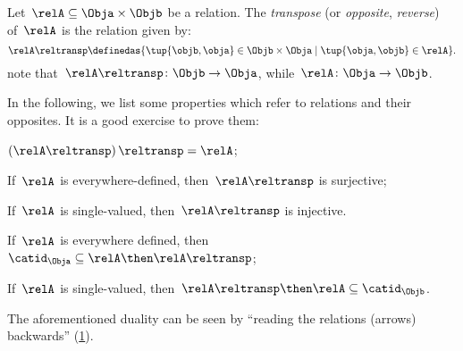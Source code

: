 \begin{definition}
  \label{def:relation-transpose}
  Let~$\relA\subseteq \Obja\times \Objb$ be a relation. The \emph{transpose} (or \emph{opposite}, \emph{reverse}) of~$\relA$ is the relation given by:
  \begin{equation*}
    \relA\reltransp \definedas \{\tup{\objb,\obja}\in \Objb\times \Obja \mid \tup{\obja,\objb}\in \relA \}.
  \end{equation*}
  note that~$\relA\reltransp\colon \Objb\to \Obja$, while~$\relA\colon \Obja\to \Objb$.
\end{definition}
\begin{remark}
  In the following, we list some properties which refer to relations and their opposites. It is a good exercise to prove them:
  \begin{compactitem}
    \item $\left(\relA\reltransp\right)\reltransp = \relA $;
    \item If~$\relA$ is everywhere-defined, then~$\relA\reltransp$ is surjective;
    \item If~$\relA$ is single-valued, then~$\relA\reltransp$ is injective.
    \item If~$\relA$ is everywhere defined, then~$\catid_\Obja\subseteq \relA\then \relA\reltransp$;
    \item If~$\relA$ is single-valued, then~$\relA\reltransp\then \relA\subseteq \catid_\Objb$.
  \end{compactitem}
\end{remark}

\begin{remark}
  The aforementioned duality can be seen by ``reading the relations (arrows) backwards'' (\cref{fig:rel_transpose}).
\end{remark}

\begin{figure}[h!]
  \centering
  \caption{\label{fig:rel_transpose}}
\end{figure}
